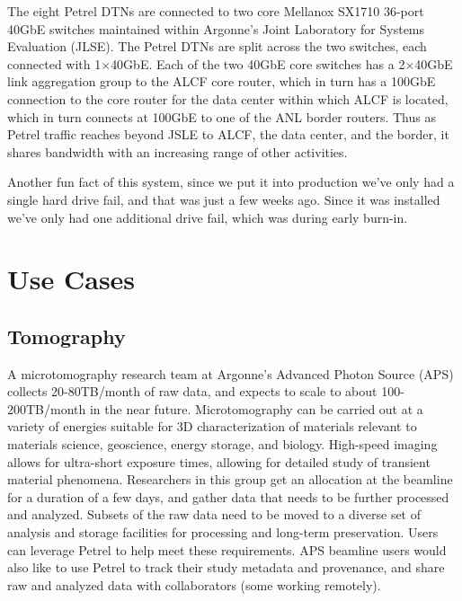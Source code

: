 \documentclass[sigconf]{acmart}
\begin{document}
The eight Petrel DTNs are connected to two core Mellanox SX1710 36-port 40GbE switches
maintained within Argonne's Joint Laboratory for Systems Evaluation (JLSE).
The Petrel DTNs are split across the two switches, each connected with 1$\times$40GbE. 
Each of the two 40GbE core switches has a 2$\times$40GbE link aggregation group to the ALCF core router, which in turn has a 100GbE connection to the core router for the data center within
which ALCF is located,
which in turn connects at 100GbE to one of the ANL border routers.
Thus as Petrel traffic reaches beyond JSLE to ALCF, the data center, and the border,
it shares bandwidth with an increasing range of other activities.



Another fun fact of this system, since we put it into production we've only had a single hard drive fail, and that was just a few weeks ago. Since it was installed we've only had one additional drive fail, which was during early burn-in.


\section{Use Cases}

\subsection{Tomography}

A microtomography research team at Argonne's Advanced Photon Source (APS) collects 20-80TB/month of raw data, and expects to scale to about 100-200TB/month in the near future. Microtomography can be carried out at a variety of energies suitable for 3D characterization of materials relevant to materials science, geoscience, energy storage, and biology. High-speed imaging allows for ultra-short exposure times, allowing for detailed study of transient material phenomena. Researchers in this group get an allocation at the beamline for a duration of a few days, and gather data that needs to be further processed and analyzed. Subsets of the raw data need to be moved to a diverse set of analysis and storage facilities for processing and long-term preservation. Users can leverage Petrel to help meet these requirements. APS beamline users would also like to use Petrel to track their study metadata and provenance, and share raw and analyzed data with collaborators (some working remotely).
\end{document}
